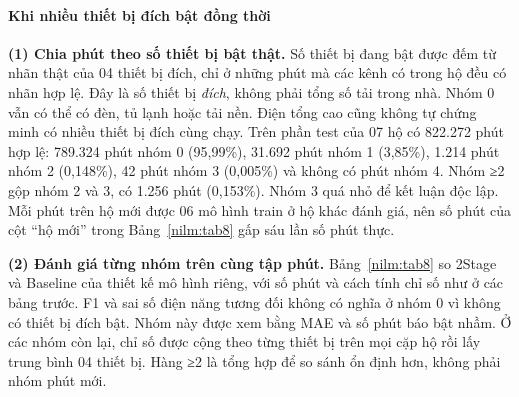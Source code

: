 \paragraph{Khi nhiều thiết bị đích bật đồng thời}

\textbf{(1) Chia phút theo số thiết bị bật thật.} Số thiết bị đang bật được đếm từ nhãn thật của 04 thiết bị đích, chỉ ở những phút mà các kênh có trong hộ đều có nhãn hợp lệ. Đây là số thiết bị \textit{đích}, không phải tổng số tải trong nhà. Nhóm 0 vẫn có thể có đèn, tủ lạnh hoặc tải nền. Điện tổng cao cũng không tự chứng minh có nhiều thiết bị đích cùng chạy. Trên phần test của 07 hộ có 822.272 phút hợp lệ: 789.324 phút nhóm 0 (95,99\%), 31.692 phút nhóm 1 (3,85\%), 1.214 phút nhóm 2 (0,148\%), 42 phút nhóm 3 (0,005\%) và không có phút nhóm 4. Nhóm ≥2 gộp nhóm 2 và 3, có 1.256 phút (0,153\%). Nhóm 3 quá nhỏ để kết luận độc lập. Mỗi phút trên hộ mới được 06 mô hình train ở hộ khác đánh giá, nên số phút của cột “hộ mới” trong Bảng~\ref{nilm:tab8} gấp sáu lần số phút thực.

\textbf{(2) Đánh giá từng nhóm trên cùng tập phút.} Bảng~\ref{nilm:tab8} so 2Stage và Baseline của thiết kế mô hình riêng, với số phút và cách tính chỉ số như ở các bảng trước. F1 và sai số điện năng tương đối không có nghĩa ở nhóm 0 vì không có thiết bị đích bật. Nhóm này được xem bằng MAE và số phút báo bật nhầm. Ở các nhóm còn lại, chỉ số được cộng theo từng thiết bị trên mọi cặp hộ rồi lấy trung bình 04 thiết bị. Hàng ≥2 là tổng hợp để so sánh ổn định hơn, không phải nhóm phút mới.


